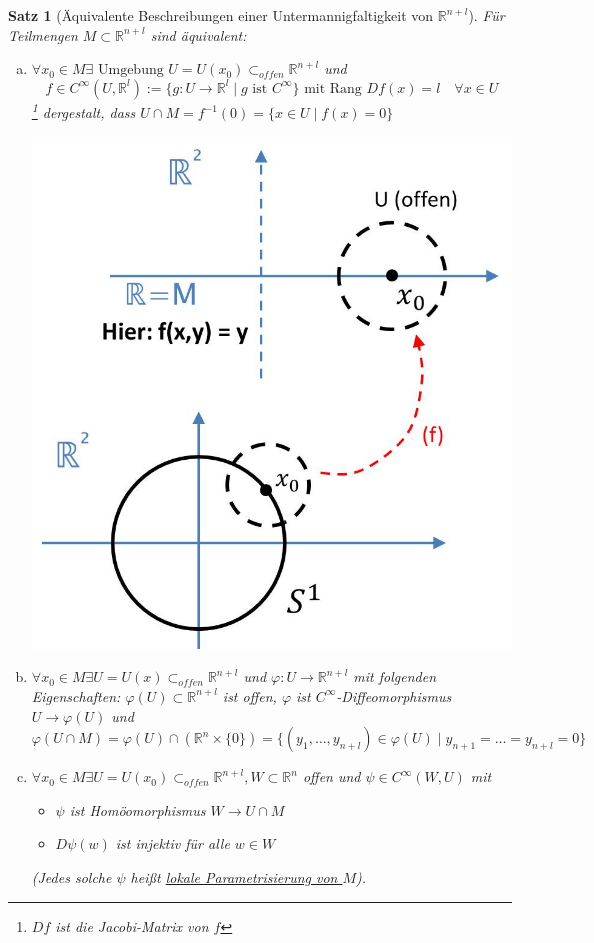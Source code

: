 \documentclass[a4paper,11pt,notitlepage]{report}
\newtheorem{theorem}{Satz}[chapter]
\newcommand{\R}{{\ensuremath{\mathbb{R}}}}
\begin{document}
\begin{theorem}[Äquivalente Beschreibungen einer Untermannigfaltigkeit von $\R^{n+l}$]
	Für Teilmengen $M \subset \R^{n+l}$ sind äquivalent:
	\begin{enumerate}[(a)]
		\item $\forall x_0 \in M \exists \text{ Umgebung } U = U(x_0) \subset_{offen} \R^{n+l}$ und $$f \in C^\infty(U, \R^l) := \{g \colon U \rightarrow \R^l \mid g \text{ ist } C^\infty\}\text{ mit Rang }Df(x) = l \quad \forall x \in U$$ \footnote{$Df$ ist die Jacobi-Matrix von $f$} dergestalt, dass $U \cap M = f^{-1}(0) = \{x \in U \mid f(x) = 0\}$ 
	\begin{center}
\includegraphics[scale=0.5]{images/Satz_UnterMf.jpg}
	\end{center}
		\item $\forall x_0 \in M \exists U = U(x) \subset_{offen} \R^{n+l}$ und $\varphi \colon U \rightarrow \R^{n+l}$ mit folgenden Eigenschaften:
		$\varphi(U) \subset \R^{n+l}$ ist offen, \newline $\varphi$ ist $C^\infty$-Diffeomorphismus $U \rightarrow \varphi(U)$ und $$\varphi(U \cap M) = \varphi(U) \cap (\R^n \times \{0\}) = \{(y_1, \ldots, y_{n+l}) \in \varphi(U) \mid y_{n+1} = \ldots = y_{n+l} = 0 \}$$
		\item $\forall x_0 \in M \exists U = U(x_0) \subset_{offen} \R^{n+l}, W \subset \R^n$ offen und $\psi \in C^\infty(W,U)$ mit 
			\begin{itemize}
				\item $\psi$ ist Homöomorphismus $W \rightarrow U \cap M$
				\item $D\psi(w)$ ist injektiv für alle $w \in W$
			\end{itemize}
			(Jedes solche $\psi$ heißt \underline{lokale Parametrisierung von $M$}).
	\end{enumerate}
\end{theorem}
\end{document}
